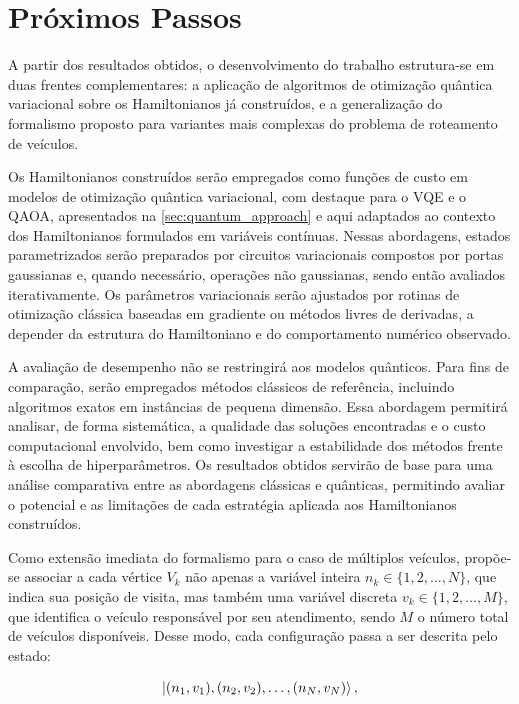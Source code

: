 \section{Próximos Passos}\label{sec:next_steps}

A partir dos resultados obtidos, o desenvolvimento do trabalho 
estrutura-se em duas frentes complementares: a aplicação de algoritmos de otimização quântica variacional sobre os Hamiltonianos já construídos, e a generalização do formalismo proposto para variantes mais complexas do problema de roteamento de veículos.

Os Hamiltonianos construídos serão empregados como funções de custo em modelos de otimização quântica variacional, com destaque para o VQE e o QAOA, apresentados na \autoref{sec:quantum_approach} e aqui adaptados ao contexto dos Hamiltonianos formulados em variáveis contínuas. Nessas abordagens, estados parametrizados serão preparados por circuitos variacionais compostos por portas gaussianas e, quando necessário, operações não gaussianas, sendo então avaliados iterativamente. Os parâmetros variacionais serão ajustados por rotinas de otimização clássica baseadas em gradiente ou métodos livres de derivadas, a depender da estrutura do Hamiltoniano e do comportamento numérico observado.

A avaliação de desempenho não se restringirá aos modelos quânticos. Para fins de comparação, serão empregados métodos clássicos de referência, incluindo algoritmos exatos em instâncias de pequena dimensão. Essa abordagem permitirá analisar, de forma sistemática, a qualidade das soluções encontradas e o custo computacional envolvido, bem como investigar a estabilidade dos métodos frente à escolha de hiperparâmetros. Os resultados obtidos servirão de base para uma análise comparativa entre as abordagens clássicas e quânticas, permitindo avaliar o potencial e as limitações de cada estratégia aplicada aos Hamiltonianos construídos.

Como extensão imediata do formalismo para o caso de múltiplos veículos, propõe-se associar a cada vértice $V_k$ não apenas a variável inteira $n_k \in \{1, 2, \ldots, N\}$, que indica sua posição de visita, mas também uma variável discreta $v_k \in \{1, 2, \ldots, M\}$, que identifica o veículo responsável por seu atendimento, sendo $M$ o número total de veículos disponíveis. Desse modo, cada configuração passa a ser descrita pelo estado:

\begin{equation}
\ket{(n_1, v_1),(n_2, v_2), \ldots,(n_N, v_N)},
\end{equation}

